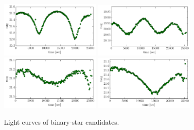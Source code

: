 \documentclass[iop, apj]{emulateapj}
\newcommand{\?}{\stackrel{?}{=}}
\begin{document}
\begin{figure}[t]
\includegraphics[width=5cm,clip,angle=90]{pic/binary/cand_21.pdf}
\includegraphics[width=5cm,clip,angle=90]{pic/binary/cand_22.pdf}
\includegraphics[width=5cm,clip,angle=90]{pic/binary/cand_23.pdf}
\includegraphics[width=5cm,clip,angle=90]{pic/binary/cand_24.pdf}
\caption{{\small
Light curves of binary-star candidates.
}}
\label{fig:candbinary}
\end{figure}


\clearpage
\end{document}
